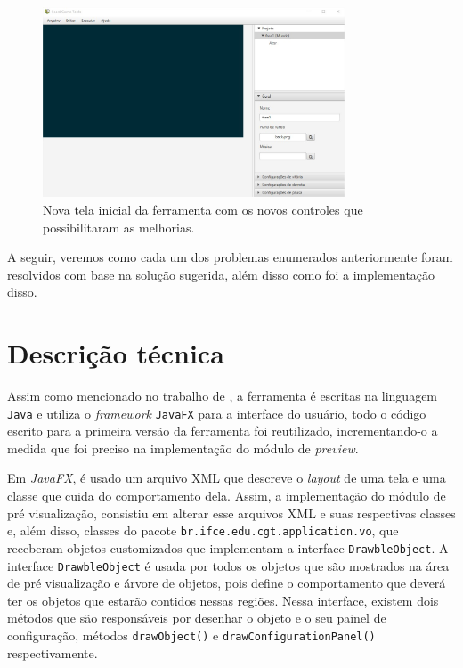 \documentclass[12pt,twoside,openright,a4paper,english,brazil,sumario=tradicional]{abntex2}
\begin{document}
\begin{figure}[h]
\centering
\includegraphics[width=0.8\textwidth]{images/tela_inicial_2.jpg}
\caption{Nova tela inicial da ferramenta com os novos controles que possibilitaram as melhorias.}
\label{fig:tela_inicial_2}
\end{figure}

A seguir, veremos como cada um dos problemas enumerados anteriormente foram resolvidos com base na solução sugerida, além disso como foi a implementação disso.

\section{Descrição técnica}

Assim como mencionado no trabalho de \cite{monografia:aquino}, a ferramenta é escritas na linguagem \texttt{Java} e utiliza o \emph{framework} \texttt{JavaFX} para a interface do usuário, todo o código escrito para a primeira versão da ferramenta foi reutilizado, incrementando-o a medida que foi preciso na implementação do módulo de \textit{preview}.

Em \emph{JavaFX}, é usado um arquivo XML que descreve o \emph{layout} de uma tela e uma classe que cuida do comportamento dela. Assim, a implementação do módulo de pré visualização, consistiu em alterar esse arquivos XML e suas respectivas classes e, além disso, classes do pacote \texttt{br.ifce.edu.cgt.application.vo}, que receberam objetos customizados que implementam a interface \texttt{DrawbleObject}. A interface \texttt{DrawbleObject} é usada por todos os objetos que são mostrados na área de pré visualização e árvore de objetos, pois define o comportamento que deverá ter os objetos que estarão contidos nessas regiões. Nessa interface, existem dois métodos que são responsáveis por desenhar o objeto e o seu painel de configuração, métodos \texttt{drawObject()} e \texttt{drawConfigurationPanel()} respectivamente.
\end{document}
